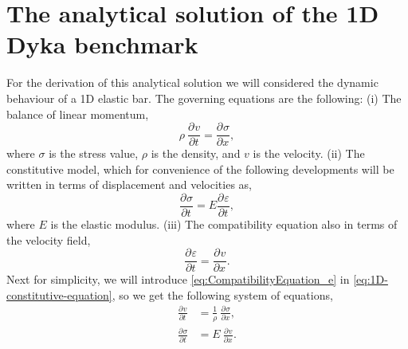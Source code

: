 \documentclass[preprint,12pt,a4paper]{elsarticle}
\newcommand{\Deriv}[3][]{
  \ensuremath{\frac{\partial^{#1}{#2}}{ \partial {#3}^{#1} }}
}
\begin{document}
\printglossaries

\appendix

\section{The analytical solution of the 1D Dyka benchmark}
\label{app:analytical_sol}

For the derivation of this analytical solution we will considered  the
dynamic behaviour of a 1D elastic bar. The governing equations are the
following: (i) The balance of linear momentum,
\begin{equation}
  \label{eq:1D-balance-linear-momentum}
  \rho\ \Deriv{v}{t} = \Deriv{\sigma}{x},
\end{equation}
where $\sigma$ is the stress value, $\rho$ is the density, and 
$v$ is the velocity. (ii) The constitutive model, which for convenience of the
following developments will be written in terms of displacement and
velocities as, 
\begin{equation}
  \label{eq:1D-constitutive-equation}
  \Deriv{\sigma}{t} = E \Deriv{\varepsilon}{t},
\end{equation}
where $E$ is the elastic modulus. (iii) The compatibility equation
also in terms of the velocity field,
\begin{equation}
  \label{eq:CompatibilityEquation_e}
  \Deriv{\varepsilon}{t} = \Deriv{v}{x}.
\end{equation}
Next for simplicity, we will introduce \eqref{eq:CompatibilityEquation_e} in 
\eqref{eq:1D-constitutive-equation}, so we get the following system of equations,
\begin{align}
  \label{eq:1D-balance-linear-momentum-II}
  \Deriv{v}{t} &= \frac{1}{\rho}\ \Deriv{\sigma}{x}, \\
  \label{eq:1D-constitutive-equation-II}
  \Deriv{\sigma}{t} &= E\ \Deriv{v}{x}.
\end{align}
\end{document}
